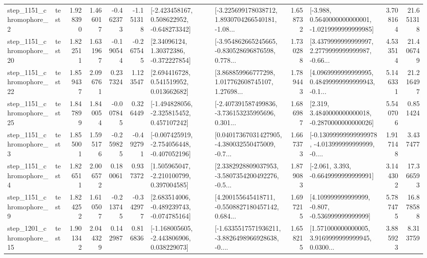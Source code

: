 \begin{tabular}{llrrrrllrlrr}
  step\_1151\_chromophore\_2 &      test &      1.928390 &    1.466017 &     -0.462373 & -1.151318 &   [-2.423458167, 0.508622952, -0.648273342] &  [-3.225699178038712, 1.8930704266540181, -1.08... &       1.658732 &  [-3.988, 0.5640000000000001, -1.0219999999999985] &            3.708164 &         21.651318 \\
 step\_1151\_chromophore\_20 &      test &      1.822511 &    1.631967 &     -0.190544 & -0.267545 &      [2.34096124, 1.30372386, -0.372227854] &  [-3.954862665245665, -0.830528696876598, 0.778... &       1.730288 &  [3.4379999999999997, 2.2779999999999987, -0.66... &            4.533514 &         21.406749 \\
 step\_1151\_chromophore\_22 &      test &      1.859437 &    2.096761 &      0.237324 &  1.123547 &     [2.694416728, 0.541519952, 0.013662682] &  [3.868859966777298, 1.017762608745107, 1.27698... &       1.789443 &  [4.0969999999999995, 0.48499999999999943, -0.1... &            5.146331 &         21.216497 \\
 step\_1151\_chromophore\_25 &      test &      1.847899 &    1.840054 &     -0.007845 &  0.326449 &   [-1.494828056, -2.325815452, 0.457107242] &  [-2.407391587499836, -3.736153235995696, 0.301... &       1.686987 &   [2.319, 3.4840000000000018, -0.2870000000000026] &            5.540706 &          0.851424 \\
  step\_1151\_chromophore\_3 &      test &      1.855001 &    1.595176 &     -0.259825 & -0.492791 &  [-0.007425919, -2.754056448, -0.407052196] &  [0.04017367031427905, -4.380032550475009, -0.7... &       1.667373 &  [-0.13099999999999978, -4.013999999999999, -0.... &            1.917148 &          3.437477 \\
  step\_1151\_chromophore\_4 &      test &      1.826511 &    2.006572 &      0.180061 &  0.937372 &    [1.505965047, -2.210100799, 0.397004585] &  [2.3382928809037953, -3.5807354200492276, -0.5... &       1.879083 &               [-2.061, 3.393, -0.6649999999999991] &            3.144302 &         17.366593 \\
  step\_1151\_chromophore\_9 &      test &      1.824252 &    1.610507 &     -0.213745 & -0.342977 &   [2.683514006, -0.489239743, -0.074785164] &  [4.200155645418711, -0.5508827180457142, 0.684... &       1.697215 &    [4.109999999999999, -0.807, -0.536999999999999] &            5.787475 &         16.878588 \\
 step\_1201\_chromophore\_15 &      test &      1.901342 &    2.044329 &      0.142987 &  0.816836 &   [-1.168005605, -2.443806906, 0.038229073] &  [-1.6335517571936211, -3.8826498966928638, -0.... &       1.658215 &  [1.571000000000005, 3.9169999999999945, 0.0300... &            3.885923 &          8.313759 \\

\end{tabular}
